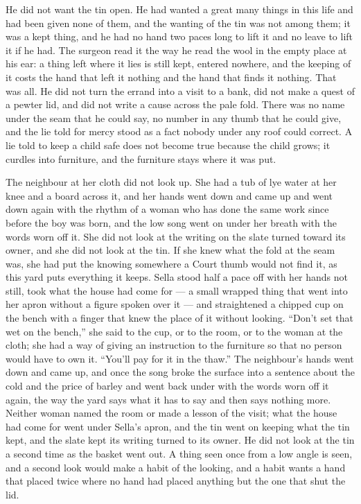 He did not want the tin open. He had wanted a great many things in this life and had been given none of them, and the wanting of the tin was not among them; it was a kept thing, and he had no hand two paces long to lift it and no leave to lift it if he had. The surgeon read it the way he read the wool in the empty place at his ear: a thing left where it lies is still kept, entered nowhere, and the keeping of it costs the hand that left it nothing and the hand that finds it nothing. That was all. He did not turn the errand into a visit to a bank, did not make a quest of a pewter lid, and did not write a cause across the pale fold. There was no name under the seam that he could say, no number in any thumb that he could give, and the lie told for mercy stood as a fact nobody under any roof could correct. A lie told to keep a child safe does not become true because the child grows; it curdles into furniture, and the furniture stays where it was put.

\scenebreak

The neighbour at her cloth did not look up. She had a tub of lye water at her knee and a board across it, and her hands went down and came up and went down again with the rhythm of a woman who has done the same work since before the boy was born, and the low song went on under her breath with the words worn off it. She did not look at the writing on the slate turned toward its owner, and she did not look at the tin. If she knew what the fold at the seam was, she had put the knowing somewhere a Court thumb would not find it, as this yard puts everything it keeps. Sella stood half a pace off with her hands not still, took what the house had come for --- a small wrapped thing that went into her apron without a figure spoken over it --- and straightened a chipped cup on the bench with a finger that knew the place of it without looking. “Don't set that wet on the bench,” she said to the cup, or to the room, or to the woman at the cloth; she had a way of giving an instruction to the furniture so that no person would have to own it. “You'll pay for it in the thaw.” The neighbour's hands went down and came up, and once the song broke the surface into a sentence about the cold and the price of barley and went back under with the words worn off it again, the way the yard says what it has to say and then says nothing more. Neither woman named the room or made a lesson of the visit; what the house had come for went under Sella's apron, and the tin went on keeping what the tin kept, and the slate kept its writing turned to its owner. He did not look at the tin a second time as the basket went out. A thing seen once from a low angle is seen, and a second look would make a habit of the looking, and a habit wants a hand that placed twice where no hand had placed anything but the one that shut the lid.

